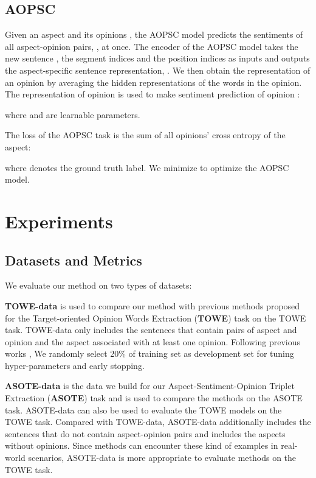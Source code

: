 \documentclass[11pt]{article}
\begin{document}
\subsection{AOPSC}
Given an aspect  and its opinions  , the AOPSC model predicts the sentiments  of all aspect-opinion pairs, , at once. The encoder of the AOPSC model takes the new sentence , the segment indices  and the position indices  as inputs and outputs the aspect-specific sentence representation, . We then obtain the representation of an opinion by averaging the hidden representations of the words in the opinion. The representation  of opinion  is used to make sentiment prediction  of opinion :

where  and  are learnable parameters.

The loss of the AOPSC task is the sum of all opinions' cross entropy of the aspect:

where  denotes the ground truth label. We minimize  to optimize the AOPSC model. 

\section{Experiments}
\subsection{Datasets and Metrics}
We evaluate our method on two types of datasets:

\textbf{TOWE-data} \citep{fan2019target} is used to compare our method with previous methods proposed for the Target-oriented Opinion Words Extraction (\textbf{TOWE}) task on the TOWE task. TOWE-data only includes the sentences that contain pairs of aspect and opinion and the aspect associated with at least one opinion. Following previous works \citep{fan2019target, wu2020latent},  We randomly select 20\% of training set as development set for tuning hyper-parameters and early stopping. 

\textbf{ASOTE-data} is the data we build for our Aspect-Sentiment-Opinion Triplet Extraction (\textbf{ASOTE}) task and is used to compare the methods on the ASOTE task. ASOTE-data can also be used to evaluate the TOWE models on the TOWE task.  Compared with TOWE-data, ASOTE-data additionally includes the sentences that do not contain aspect-opinion pairs and includes the aspects without opinions. Since methods can encounter these kind of examples in real-world scenarios, ASOTE-data is more appropriate to evaluate methods on the TOWE task. 
\end{document}
